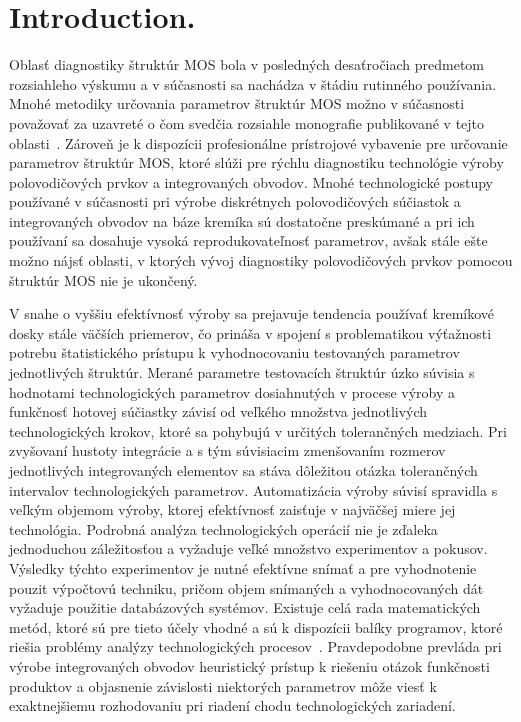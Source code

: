\chapter{Introduction.}\label{Introduction}

\par Oblasť diagnostiky štruktúr MOS bola v posledných desaťročiach
predmetom rozsiahleho výskumu a v súčasnosti sa nachádza v štádiu
rutinného používania. Mnohé metodiky určovania parametrov štruktúr MOS
možno v súčasnosti považovať za uzavreté o čom svedčia rozsiahle
monografie publikované v tejto oblasti~\cite{I.1, I.2, I.3,
  I.4}. Zároveň je k dispozícii profesionálne prístrojové vybavenie
pre určovanie parametrov štruktúr MOS, ktoré slúži pre rýchlu
diagnostiku technológie výroby polovodičových prvkov a integrovaných
obvodov. Mnohé technologické postupy používané v súčasnosti pri výrobe
diskrétnych polovodičových súčiastok a integrovaných obvodov na báze
kremíka sú dostatočne preskúmané a pri ich používaní sa dosahuje
vysoká reprodukovateľnosť parametrov, avšak stále ešte možno nájsť
oblasti, v ktorých vývoj diagnostiky polovodičových prvkov pomocou
štruktúr MOS nie je ukončený.

\par V snahe o vyššiu efektívnosť výroby sa prejavuje tendencia
používať kremíkové dosky stále väčších priemerov, čo prináša v spojení
s problematikou výťažnosti potrebu štatistického prístupu k
vyhodnocovaniu testovaných parametrov jednotlivých štruktúr. Merané
parametre testovacích štruktúr úzko súvisia s hodnotami
technologických parametrov dosiahnutých v procese výroby a funkčnosť
hotovej súčiastky závisí od veľkého množstva jednotlivých
technologických krokov, ktoré sa pohybujú v určitých tolerančných
medziach. Pri zvyšovaní hustoty integrácie a s tým súvisiacim
zmenšovaním rozmerov jednotlivých integrovaných elementov sa stáva
dôležitou otázka tolerančných intervalov technologických
parametrov. Automatizácia výroby súvisí spravidla s veľkým objemom
výroby, ktorej efektívnosť zaisťuje v najväčšej miere jej
technológia. Podrobná analýza technologických operácií nie je zďaleka
jednoduchou záležitosťou a vyžaduje veľké množstvo experimentov a
pokusov. Výsledky týchto experimentov je nutné efektívne snímať a pre
vyhodnotenie pouzit výpočtovú techniku, pričom objem snímaných a
vyhodnocovaných dát vyžaduje použitie databázových systémov.  Existuje
celá rada matematických metód, ktoré sú pre tieto účely vhodné a sú k
dispozícii balíky programov, ktoré riešia problémy analýzy
technologických procesov~\cite{I.5}. Pravdepodobne prevláda pri výrobe
integrovaných obvodov heuristický prístup k riešeniu otázok funkčnosti
produktov a objasnenie závislosti niektorých parametrov môže viesť k
exaktnejšiemu rozhodovaniu pri riadení chodu technologických
zariadení.

